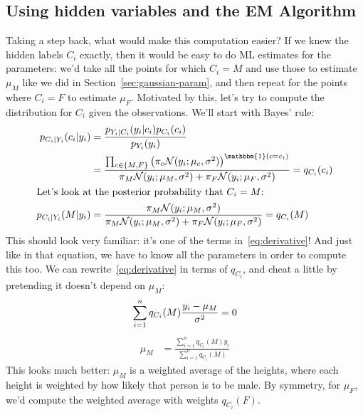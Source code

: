 \documentclass[12pt]{article}
\newcommand{\N}{\mathcal{N}}
\newcommand{\indicator}{\mathbbm{1}}
\begin{document}
    \subsection{Using hidden variables and the EM Algorithm}
    Taking a step back, what would make this computation easier? If we knew the
    hidden labels $C_i$ exactly, then it would be easy to do ML estimates for
    the parameters: we'd take all the points for which $C_i = M$ and use those
    to estimate $\mu_M$ like we did in Section~\ref{sec:gaussian-param}, and
    then repeat for the points where $C_i = F$ to estimate $\mu_F$.  Motivated
    by this, let's try to compute the distribution for $C_i$ given the
    observations. We'll start with Bayes' rule:
    \begin{align}
        \notag p_{C_i | Y_i}(c_i | y_i) &= \frac{p_{Y_i | C_i}(y_i | c_i) p_{C_i}(c_i)}{p_{Y_i}(y_i)} \\
        \label{eq:qc-general} &= \frac{ \prod_{c \in \{M, F\}} \left(\pi_c \N(y_i ; \mu_c, \sigma^2)\right)^{\indicator(c = c_i)}}{\pi_M\N(y_i; \mu_M, \sigma^2) + \pi_F\N(y_i; \mu_F, \sigma^2)} = q_{C_i}(c_i) \\
        \intertext{Let's look at the posterior probability that $C_i = M$:}
        \label{eq:qc} p_{C_i | Y_i}(M | y_i) &= \frac{\pi_M \N(y_i ; \mu_M, \sigma^2)}{\pi_M\N(y_i; \mu_M, \sigma^2) + \pi_F\N(y_i; \mu_F, \sigma^2)} = q_{C_i}(M)
    \end{align}
    This should look very familiar: it's one of the terms
    in~\eqref{eq:derivative}!  And just like in that equation, we have to know
    all the parameters in order to compute this too. We can
    rewrite~\eqref{eq:derivative} in terms of $q_{C_i}$, and cheat a little by
    pretending it doesn't depend on $\mu_M$:
    \begin{equation}
        \label{eq:pre-m-step} \sum_{i=1}^n q_{C_i}(M) \frac{y_i-\mu_M}{\sigma^2} = 0 \\
    \end{equation}
    \begin{align}
        \label{eq:weighted-average} \mu_M &= \frac{\displaystyle \sum_{i=1}^n q_{C_i}(M) y_i}{\displaystyle \sum_{i=1}^n q_{C_i}(M)}
    \end{align}
    This looks much better: $\mu_M$ is a weighted average of the heights, where each
    height is weighted by how likely that person is to be male. By symmetry, for
    $\mu_F$, we'd compute the weighted average with weights $q_{C_i}(F)$.
\end{document}
